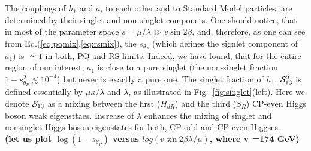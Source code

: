 \documentclass[aps,prl,twocolumn,nofootinbib,superscriptaddress]{revtex4}
\def\SC{{\cal S}}
\begin{document}
The couplings of $h_1$ and $a$, to each other and to Standard Model
particles, are determined by their singlet and non-singlet componets.
One should notice, that in most of the  parameter space
$s=\mu/\lambda\gg v\sin 2\beta$, and, therefore, 
as one can see from Eq.(\ref{eq:pqmix},\ref{eq:rsmix}), 
the $s_{\theta_P}$ (which defines the signlet component of $a_1$)
is $\simeq 1$ in both, PQ and RS limits. 
Indeed, we have found, that
for the entire region of our interest, $a_1$ is close to a pure singlet 
(the non-singlet fraction $1-s_{\theta_P}^2  \lesssim 10^{-4}$)
but never is exactly a pure one.
The singlet fraction of $h_1$, $\SC_{13}^2$
is defined essentially by
$\mu\kappa/\lambda$ and $\lambda$,  as
illustrated in Fig.~\ref{fig:singlet}(left). 
Here we denote  $\SC_{13}$ as a mixing between the first ($H_{dR}$)
and  the third ($S_{R}$) CP-even Higgs boson weak eigensttaes.  
Increase of $\lambda$  enhances the  mixing of singlet and nonsinglet
Higgs boson eigenstates for both, CP-odd and CP-even Higgses.
\\
{\bf (let us plot  $\log(1-s_{\theta_P})$ versus $log( v \sin 2\beta \lambda/\mu)$,
 where v =174 GeV)}
 \\
 
\end{document}
